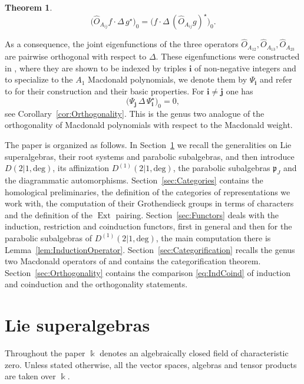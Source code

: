 \documentclass[10pt]{amsart}
\newtheorem{theoremC}{Theorem}
\newcommand{\fp}{{\mathfrak p}}
\newcommand{\Ddeg}{D(2|1,\mathrm{deg})}
\newcommand{\Daff}{D^{(1)}(2|1,\mathrm{deg})}
\DeclareMathOperator{\Ext}{Ext}
\begin{document}
	\begin{theoremC}
		\[\bigl(\hat O_{A_{ij}}f\cdot \Delta\, g^{\star}\bigr)_0
		=\bigl(f\cdot \Delta\,(\hat O_{A_{ij}}g)^{\star}\bigr)_0.\]
	\end{theoremC}
	
	
	As a consequence, the joint eigenfunctions of the three operators $\hat O_{A_{12}},\hat O_{A_{13}},\hat O_{A_{23}}$ are pairwise orthogonal with respect to $\Delta$. These eigenfunctions were constructed in \cite{ArthamonovShakirov-2019}, where they are shown to be indexed by triples $\mathbf{i}$ of non-negative integers and to specialize to the $A_1$ Macdonald polynomials, we denote them by $\Psi_{\mathbf{i}}$ and refer to \cite{ArthamonovShakirov-2019} for their construction and their basic properties. For $\mathbf{i}\neq\mathbf{j}$ one has
	\[\bigl( \Psi_{\mathbf{j}}\,\Delta\, \Psi^{\star}_{\mathbf{i}} \bigr)_0=0,\]
	see Corollary~\ref{cor:Orthogonality}. This is the genus two analogue of the orthogonality of Macdonald polynomials with respect to the Macdonald weight.
	
	The paper is organized as follows. In Section~\ref{sec:LieSuperalgebras} we recall the generalities on Lie superalgebras, their root systems and parabolic subalgebras, and then introduce $\Ddeg$, its affinization $\Daff$, the parabolic subalgebras $\fp_J$ and the diagrammatic automorphisms. Section~\ref{sec:Categories} contains the homological preliminaries, the definition of the categories of representations we work with, the computation of their Grothendieck groups in terms of characters and the definition of the $\Ext$ pairing. Section~\ref{sec:Functors} deals with the induction, restriction and coinduction functors, first in general and then for the parabolic subalgebras of $\Daff$, the main computation there is Lemma~\ref{lem:InductionOperator}. Section~\ref{sec:Categorification} recalls the genus two Macdonald operators of \cite{ArthamonovShakirov-2019} and contains the categorification theorem. Section~\ref{sec:Orthogonality} contains the comparison \eqref{eq:IndCoind} of induction and coinduction and the orthogonality statements. %
	
	\section{Lie superalgebras}\label{sec:LieSuperalgebras}
	
	Throughout the paper $\Bbbk$ denotes an algebraically closed field of characteristic zero. Unless stated otherwise, all the vector spaces, algebras and tensor products are taken over $\Bbbk$.
	
\end{document}

